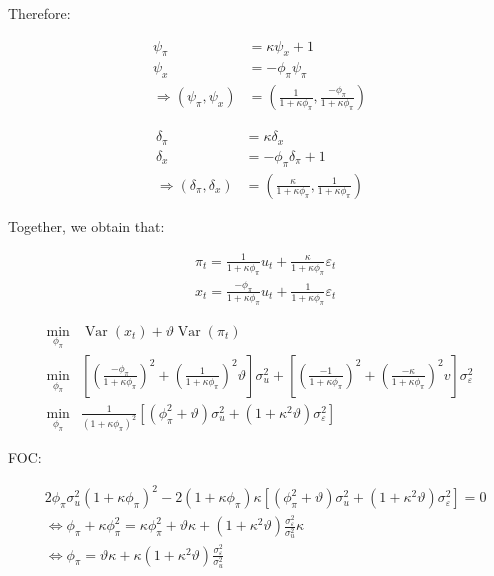 {\begin{enumerate}[label=(\arabic*)]
{Therefore:

$$
\begin{aligned}
\psi_{\pi} &= \kappa \psi_{x}+1 \\
\psi_{x} &= -\phi_{\pi} \psi_{\pi} \\
\Longrightarrow 
\left(\psi_{\pi}, \psi_{x}\right) &= \left(\frac{1}{1+\kappa \phi_{\pi}}, \frac{-\phi_{\pi}}{1+\kappa \phi_{\pi}}\right)
\end{aligned}
$$

$$
\begin{aligned}
\delta_{\pi} &= \kappa \delta_{x} \\
\delta_{x} &= -\phi_{\pi} \delta_{\pi}+1 \\
\Longrightarrow 
\left(\delta_{\pi}, \delta_{x}\right) &= \left(\frac{\kappa}{1+\kappa \phi_{\pi}}, \frac{1}{1+\kappa \phi_{\pi}}\right)
\end{aligned}
$$

Together, we obtain that:

$$
\begin{aligned}
& \pi_{t}=\frac{1}{1+\kappa \phi_{\pi}} u_{t}+\frac{\kappa}{1+\kappa \phi_{\pi}} \varepsilon_{t} \\
& x_{t}=\frac{-\phi_{\pi}}{1+\kappa \phi_{\pi}} u_{t}+\frac{1}{1+\kappa \phi_{\pi}} \varepsilon_{t}
\end{aligned}
$$
}
{
\item 
\begin{align*}
    \min _{\phi_{\pi}}& \operatorname{Var}\left(x_{t}\right)+\vartheta \operatorname{Var}\left(\pi_{t}\right) \\
    \min _{\phi_{\pi}}& \left[\left(\frac{-\phi_{\pi}}{1+\kappa \phi_{\pi}}\right)^{2}+\left(\frac{1}{1+\kappa \phi_{\pi}}\right)^{2} \vartheta\right] \sigma_{u}^{2} +\left[\left(\frac{-1}{1+\kappa \phi_{\pi}}\right)^{2}+\left(\frac{-\kappa}{1+\kappa \phi_{\pi}}\right)^{2} v\right] \sigma_{\varepsilon}^{2} \\
    \min _{\phi_{\pi}}& \frac{1}{\left(1+\kappa \phi_{\pi}\right)^{2}}\left[\left(\phi_{\pi}^{2}+\vartheta\right) \sigma_u^{2} +\left(1+\kappa^{2} \vartheta\right) \sigma_{\varepsilon}^{2}\right]
\end{align*}

FOC:

\begin{align*}
    & 2 \phi_\pi \sigma_u^2\left(1+\kappa \phi_\pi\right)^2 -2\left(1+\kappa \phi_\pi\right) \kappa \left[\left(\phi_\pi^2+\vartheta\right) \sigma_u^2+\left(1+\kappa^2 \vartheta\right) \sigma_{\varepsilon}^2\right]=0 \\
    & \Longleftrightarrow \phi_\pi+\kappa \phi_\pi^2=\kappa \phi_\pi^2+\vartheta \kappa+\left(1+\kappa^2 \vartheta\right)\frac{\sigma_{\varepsilon}^2}{\sigma_u^2} \kappa \\
    & \Longleftrightarrow \phi_\pi= \vartheta\kappa+\kappa\left(1+\kappa^2 \vartheta\right) \frac{\sigma_\varepsilon^2}{\sigma_u^2}
\end{align*}

}
\end{enumerate}}
